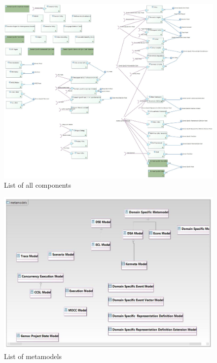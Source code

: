 \documentclass{gemoc} %
\begin{document}
\begin{figure}[htp]
	\begin{center}
	\includegraphics*[trim=0.0cm 0.0cm 0cm 0.0cm, clip=true, width=1.0\linewidth]{../images/All Components list.jpg}
	\caption{List of all components}
	\label{fig:AllComponentList}
	\end{center}
\end{figure}
\begin{figure}[htp]
	\begin{center}
	\includegraphics*[trim=0.0cm 0.0cm 0cm 0.0cm, clip=true, width=1.0\linewidth]{../images/Gemoc Metamodels Class Diagram.jpg}
	\caption{List of metamodels}
	\label{fig:MetamodelList}
	\end{center}
\end{figure}
\end{document}
